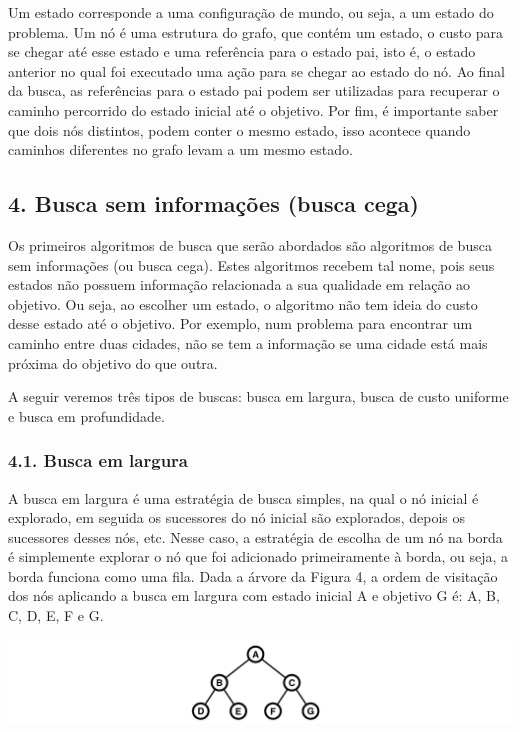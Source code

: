 \documentclass[brazil,]{article}
\let\origfigure=\figure
\let\endorigfigure=\endfigure
\renewenvironment{figure}[1][]{%
\origfigure[H]
}{%
\endorigfigure
}
\begin{document}
Um estado corresponde a uma configuração de mundo, ou seja, a um estado
do problema. Um nó é uma estrutura do grafo, que contém um estado, o
custo para se chegar até esse estado e uma referência para o estado pai,
isto é, o estado anterior no qual foi executado uma ação para se chegar
ao estado do nó. Ao final da busca, as referências para o estado pai
podem ser utilizadas para recuperar o caminho percorrido do estado
inicial até o objetivo. Por fim, é importante saber que dois nós
distintos, podem conter o mesmo estado, isso acontece quando caminhos
diferentes no grafo levam a um mesmo estado.

\subsection{4. Busca sem informações (busca
cega)}\label{busca-sem-informauxe7uxf5es-busca-cega}

Os primeiros algoritmos de busca que serão abordados são algoritmos de
busca sem informações (ou busca cega). Estes algoritmos recebem tal
nome, pois seus estados não possuem informação relacionada a sua
qualidade em relação ao objetivo. Ou seja, ao escolher um estado, o
algoritmo não tem ideia do custo desse estado até o objetivo. Por
exemplo, num problema para encontrar um caminho entre duas cidades, não
se tem a informação se uma cidade está mais próxima do objetivo do que
outra.

A seguir veremos três tipos de buscas: busca em largura, busca de custo
uniforme e busca em profundidade.

\subsubsection{4.1. Busca em largura}\label{busca-em-largura}

A busca em largura é uma estratégia de busca simples, na qual o nó
inicial é explorado, em seguida os sucessores do nó inicial são
explorados, depois os sucessores desses nós, etc. Nesse caso, a
estratégia de escolha de um nó na borda é simplemente explorar o nó que
foi adicionado primeiramente à borda, ou seja, a borda funciona como uma
fila. Dada a árvore da Figura 4, a ordem de visitação dos nós aplicando
a busca em largura com estado inicial A e objetivo G é: A, B, C, D, E, F
e G.

\begin{figure}
\centering
\includegraphics{arvore.png}
\caption{Árvore binária.}
\end{figure}
\end{document}
